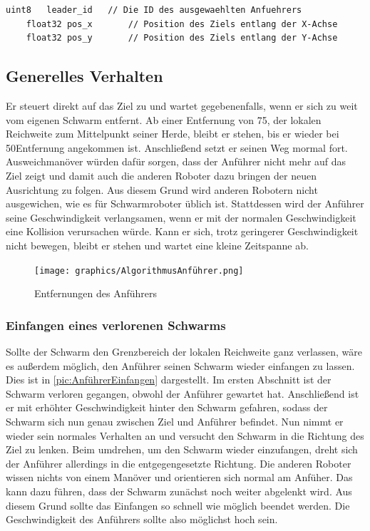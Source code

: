 \begin{lstlisting}[style=ros, title=Nachrichten-Typ: New\_Mission.msg]
	uint8	leader_id	// Die ID des ausgewaehlten Anfuehrers
	float32 pos_x		// Position des Ziels entlang der X-Achse
	float32 pos_y		// Position des Ziels entlang der Y-Achse
\end{lstlisting}

\subsection*{Generelles Verhalten}

Er steuert direkt auf das Ziel zu und wartet gegebenenfalls, wenn er sich zu weit vom eigenen Schwarm entfernt. Ab einer Entfernung von 75\per, der lokalen Reichweite zum Mittelpunkt seiner Herde, bleibt er stehen, bis er wieder bei 50\per Entfernung angekommen ist. Anschließend setzt er seinen Weg mormal fort. Ausweichmanöver würden dafür sorgen, dass der Anführer nicht mehr auf das Ziel zeigt und damit auch die anderen Roboter dazu bringen der neuen Ausrichtung zu folgen. Aus diesem Grund wird anderen Robotern nicht ausgewichen, wie es für Schwarmroboter üblich ist. Stattdessen wird der Anführer seine Geschwindigkeit verlangsamen, wenn er mit der normalen Geschwindigkeit eine Kollision verursachen würde. Kann er sich, trotz geringerer Geschwindigkeit nicht bewegen, bleibt er stehen und wartet eine kleine Zeitspanne ab.

\begin{figure}
	\texttt{[image: graphics/AlgorithmusAnführer.png]}
	\caption{Entfernungen des Anführers}
	\label{pic:AnführerReichweiten}
\end{figure}

\subsubsection*{Einfangen eines verlorenen Schwarms}\label{subsubsec:AnführerEinfangen}
Sollte der Schwarm den Grenzbereich der lokalen Reichweite ganz verlassen, wäre es außerdem möglich, den Anführer seinen Schwarm wieder einfangen zu lassen. Dies ist in \autoref{pic:AnführerEinfangen} dargestellt.
Im ersten Abschnitt ist der Schwarm verloren gegangen, obwohl der Anführer gewartet hat. Anschließend ist er mit erhöhter Geschwindigkeit hinter den Schwarm gefahren, sodass der Schwarm sich nun genau zwischen Ziel und Anführer befindet. Nun nimmt er wieder sein normales Verhalten an und versucht den Schwarm in die Richtung des Ziel zu lenken. Beim umdrehen, um den Schwarm wieder einzufangen, dreht sich der Anführer allerdings in die entgegengesetzte Richtung. Die anderen Roboter wissen nichts von einem Manöver und orientieren sich normal am Anfüher. Das kann dazu führen, dass der Schwarm zunächst noch weiter abgelenkt wird. Aus diesem Grund sollte das Einfangen so schnell wie möglich beendet werden. Die Geschwindigkeit des Anführers sollte also möglichst hoch sein.

